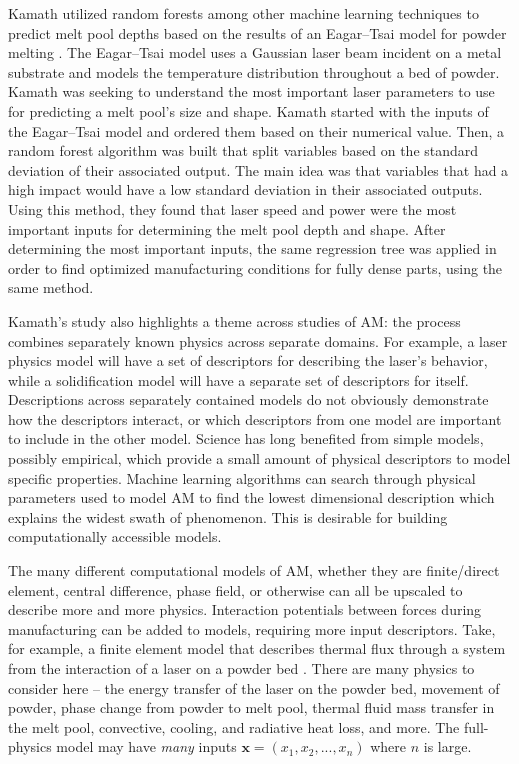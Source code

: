 Kamath utilized random forests among other machine learning techniques to predict melt pool depths based on the results of an Eagar--Tsai model for powder melting \cite{Kamath2016}. The Eagar--Tsai model uses a Gaussian laser beam incident on a metal substrate and models the temperature distribution throughout a bed of powder. Kamath was seeking to understand the most important laser parameters to use for predicting a melt pool's size and shape. Kamath started with the inputs of the Eagar--Tsai model and ordered them based on their numerical value. Then, a random forest algorithm was built that split variables based on the standard deviation of their associated output. The main idea was that variables that had a high impact would have a low standard deviation in their associated outputs. Using this method, they found that laser speed and power were the most important inputs for determining the melt pool depth and shape. After determining the most important inputs, the same regression tree was applied in order to find optimized manufacturing conditions for fully dense parts, using the same method.

Kamath's study also highlights a theme across studies of AM: the process combines separately known physics across separate domains. For example, a laser physics model will have a set of descriptors for describing the laser's behavior, while a solidification model will have a separate set of descriptors for itself. Descriptions across separately contained models do not obviously demonstrate how the descriptors interact, or which descriptors from one model are important to include in the other model. Science has long benefited from simple models, possibly empirical, which provide a small amount of physical descriptors to model specific properties. Machine learning algorithms can search through physical parameters used to model AM to find the lowest dimensional description which explains the widest swath of phenomenon. This is desirable for building computationally accessible models.

The many different computational models of AM, whether they are finite/direct element, central difference, phase field, or otherwise can all be upscaled to describe more and more physics.  Interaction potentials between forces during manufacturing can be added to models, requiring more input descriptors. Take, for example, a finite element model that describes thermal flux through a system from the interaction of a laser on a powder bed \cite{Khairallah2016}. There are many physics to consider here -- the energy transfer of the laser on the powder bed, movement of powder, phase change from powder to melt pool, thermal fluid mass transfer in the melt pool, convective, cooling, and radiative heat loss, and more. The full-physics model may have \textit{many} inputs $\mathbf{x} = (x_1,x_2,...,x_n)$ where $n$ is large.

